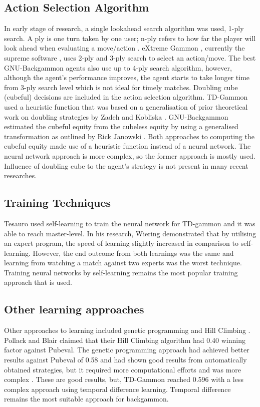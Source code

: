 \documentclass[12pt,a4paper]{article}
\begin{document}
\subsection{Action Selection Algorithm}
In early stage of research, a single lookahead search algorithm was used, 1-ply search. A ply is one turn taken by one user; n-ply refers to how far the player will look ahead when evaluating a move/action \cite{glossary}. eXtreme Gammon \citeyear{exg}, currently the supreme software \cite{botbattle}, uses 2-ply and 3-ply search to select an action/move. The best GNU-Backgammon \cite{gnubg} agents also use up to 4-ply search algorithm, however, although the agent's performance improves, the agent starts to take longer time from 3-ply search level which is not ideal for timely matches. Doubling cube (cubeful) decisions are included in the action selection algorithm. TD-Gammon used a heuristic function that was based on a generalisation of prior theoretical work on doubling strategies by Zadeh and Kobliska \cite{DBLP:journals/ai/Tesauro02}. GNU-Backgammon estimated the cubeful equity from the cubeless equity by using a generalised transformation as outlined by Rick Janowski \cite{gnubg}. Both approaches to computing the cubeful equity made use of a heuristic function instead of a neural network.  The neural network approach is more complex, so the former approach is mostly used. Influence of doubling cube to the agent's strategy is not present in many recent researches. 

\subsection{Training Techniques}
Tesauro \citeyear{DBLP:conf/icml/Tesauro92} used self-learning to train the neural network for TD-gammon and it was able to reach master-level. In his research, Wiering \citeyear{DBLP:journals/jilsa/Wiering10} demonstrated that by utilising an expert program, the speed of learning slightly increased in comparison to self-learning. However, the end outcome from both learnings was the same and learning from watching a match against two experts was the worst technique. Training neural networks by self-learning remains the most popular training approach that is used.

\subsection{Other learning approaches}
Other approaches to learning included genetic programming \cite{DBLP:journals/gpem/AzariaS05} and Hill Climbing \cite{DBLP:journals/ml/PollackB98}. Pollack and Blair claimed that their Hill Climbing algorithm had 0.40 winning factor against Pubeval. The genetic programming approach had achieved better results against Pubeval of 0.58 and had shown good results from automatically obtained strategies, but it required more computational efforts and was more complex \cite{DBLP:journals/gpem/AzariaS05}. These are good results, but, TD-Gammon reached 0.596 with a less complex approach using temporal difference learning. Temporal difference remains the most suitable approach for backgammon.
\end{document}
